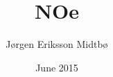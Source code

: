 \documentclass[twoside,english]{uiofysmaster}
\author{J\o rgen Eriksson Midtb\o}
\title{NOe}
\date{June 2015}
\begin{document}
\begin{titlepage}
\maketitle
\end{titlepage}
\end{document}

